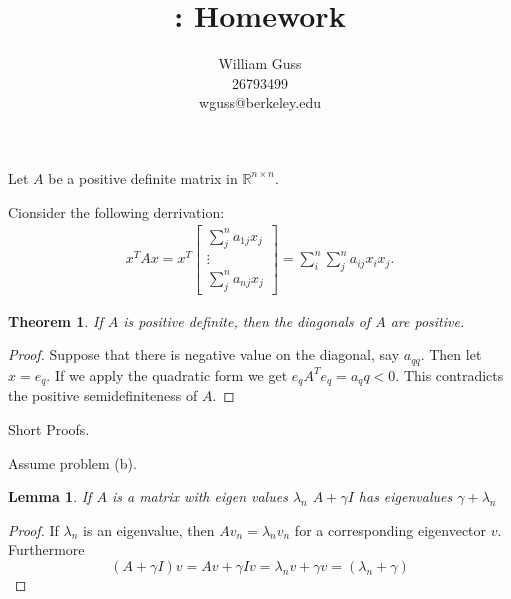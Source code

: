 \documentclass[letter]{article}
\title{\bCLASS: Homework \bHWN}
\author{William Guss\\26793499\\wguss@berkeley.edu}
\newtheorem{theorem}{Theorem}
\newtheorem{lemma}{Lemma}
\newenvironment{menumerate}{%
  \edef\backupindent{\the\parindent}%
  \enumerate%
  \setlength{\parindent}{\backupindent}%
}{\endenumerate}
\begin{document}
\maketitle
\thispagestyle{empty}

\begin{menumerate}
\item 
\item
\item Let $A$ be a positive definite matrix in $\mathbb{R}^{n\times n}.$
  \begin{menumerate}
    \item Cionsider the following derrivation:
    \begin{equation}
      \begin{aligned}
          x^TAx = x^T \begin{bmatrix}
            \sum_j^n  a_{1j}x_j \\
            \vdots\\
            \sum_j^n a_{nj}x_j
          \end{bmatrix}  = \sum_i^n \sum_j^n a_{ij}x_ix_j.
       \end{aligned}   
    \end{equation}
    \item 
    \begin{theorem}
      If $A$ is positive definite, then the diagonals of $A$ are positive.
    \end{theorem}
    \begin{proof}
      Suppose that there is negative value on the diagonal, say $a_{qq}.$
      Then let $x = e_{q}.$ If we apply the quadratic form we get $e_qA^Te_q = a_qq < 0.$ 
      This contradicts the positive semidefiniteness of $A.$
    \end{proof}
  \end{menumerate}
  \item Short Proofs. 
  \begin{menumerate}
    \item Assume problem (b).
    \begin{lemma}
      If $A$ is a matrix with eigen values $\lambda_n$  $A + \gamma I$ has eigenvalues $\gamma + \lambda_n$   
    \end{lemma}
    \begin{proof}
      If $\lambda_n$ is an eigenvalue, then $Av_n = \lambda_n v_n$  for a corresponding eigenvector $v.$
      Furthermore 
      \begin{equation}
       (A + \gamma I)v = Av + \gamma I v = \lambda_n v + \gamma v = (\lambda_n + \gamma)

\end{equation}
\end{proof}
\end{menumerate}
\end{menumerate}
\end{document}
